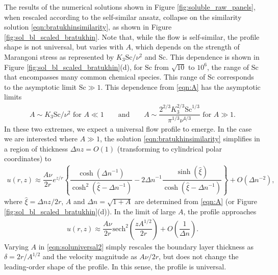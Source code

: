 \documentclass[]{jfm}
\newcommand{\Sc}{\text{Sc}}
\begin{document}
The results of the numerical solutions shown in Figure \ref{fig:soluble_raw_panels}, when rescaled according to the self-similar ansatz, collapse on the similarity solution \eqref{eqn:bratukhinsimilarity}, as shown in Figure \ref{fig:sol_bl_scaled_bratukhin}.
Note that, while the flow is self-similar, the profile shape is not universal, but varies with $A$, which depends on the strength of Marangoni stress as represented by ${K_3 \Sc}/{\nu^2}$ and $\Sc$. 
This dependence is shown in Figure \ref{fig:sol_bl_scaled_bratukhin}(d), for $\Sc$ from $\sqrt{10}$ to $10^{6}$, the range of $\Sc$ that encompasses many common chemical species.
This range of $\Sc$ corresponds to the asymptotic limit $\Sc \gg 1$.
This dependence from \eqref{eqn:A} has the asymptotic limits 
\begin{align}
A \sim {K_3 \Sc}/{\nu^2} \text{ for } A\ll 1 \qquad \text{and} \qquad A \sim \dfrac{2^{2/3} K_3^{2/3} \Sc^{1/3}}{\pi^{1/3} \nu^{4/3}}  \text{ for } A\gg 1.
\label{eqn:Ascaling}
\end{align}
In these two extremes, we expect a universal flow profile to emerge. 
In the case we are interested where $A \gg 1$, the solution \eqref{eqn:bratukhinsimilarity} simplifies in a region of thickness $\Delta n z = O(1)$ (transforming to cylindrical polar coordinates) to
\begin{align}
u(r,z) \approx \dfrac{A \nu}{2r} e^{z/r} \left\{ \dfrac{ \cosh\left( {\Delta n}^{-1} \right) }{ \cosh^2 \left( \hat{\xi} - {\Delta n}^{-1}\right) } - 2{\Delta n}^{-1} \dfrac{\sinh \left( \hat{\xi} \right) }{\cosh \left( \hat{\xi} - {\Delta n}^{-1} \right) } \right\} + O\left({\Delta n^{-2}} \right),
\label{eqn:soluniversal1}
\end{align}
where $\hat{\xi} = {\Delta n z}/{2r}$, $A$ and $\Delta n = \sqrt{1+A}$ are determined from \eqref{eqn:A} (or Figure \ref{fig:sol_bl_scaled_bratukhin}(d)).
In the limit of large $A$, the profile approaches
\begin{align}
 u(r,z) \approx \dfrac{A \nu}{2r} { \text{sech}^2 \left( \dfrac{z A^{1/2}}{2r} \right) } + O\left(\dfrac{1}{\Delta n} \right). \label{eqn:soluniversal2}
\end{align}
Varying $A$ in \eqref{eqn:soluniversal2} simply rescales the boundary layer thickness as $\delta=2r/A^{1/2}$ and the velocity magnitude as $A\nu/2r$, but does not change the leading-order shape of the profile.
In this sense, the profile is universal.
\end{document}
